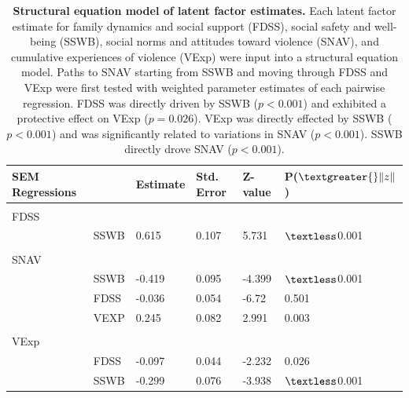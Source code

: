 \documentclass[utf8]{article}
\begin{document}
\begin{table}[h!]
\begin{tabular}{llllll}
SEM Regressions &      & Estimate & Std. Error & Z-value & P($\textgreater{}\|z\|$) \\ \hline
                           &          &            &         &                          \\
FDSS                      &          &            &         &                          \\
& SSWB & 0.615   & 0.107      & 5.731  & $\textless$0.001 \\ \hline \\
SNAV                      &          &            &         &                          \\
& SSWB & -0.419   & 0.095      & -4.399  & $\textless$0.001 \\ 
& FDSS & -0.036   & 0.054      & -6.72  & 0.501 \\ 
& VEXP & 0.245   & 0.082      & 2.991  & 0.003 \\  \hline \\
VExp                      &          &            &         &                          \\
& FDSS & -0.097   & 0.044      & -2.232  & 0.026 \\ 
& SSWB & -0.299   & 0.076      & -3.938  & $\textless$0.001 \\ 
\end{tabular}
\caption{\textbf{Structural equation model of latent factor estimates.} Each latent factor estimate for family dynamics and social support (FDSS), social safety and well-being (SSWB), social norms and attitudes toward violence (SNAV), and cumulative experiences of violence (VExp) were input into a structural equation model. Paths to SNAV starting from SSWB and moving through FDSS and VExp were first tested with weighted parameter estimates of each pairwise regression. FDSS was directly driven by SSWB ($p<0.001$) and exhibited a protective effect on VExp ($p=0.026$). VExp was directly effected by SSWB ($p<0.001$) and was significantly related to variations in SNAV ($p<0.001$). SSWB directly drove SNAV ($p<0.001$). \label{tab:11}}
\end{table}
\end{document}
